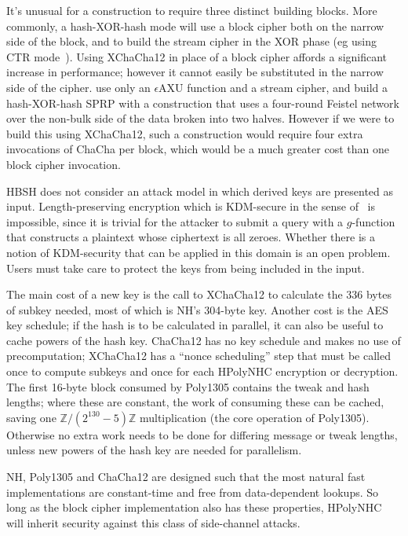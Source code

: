 \documentclass[journal=tosc,preprint,floatrow,submission]{iacrtrans}
\begin{document}
It's unusual for a construction to require three distinct building blocks.
More commonly, a hash-XOR-hash mode will use a block cipher both on the narrow side of the
block, and to build the stream cipher in the XOR phase (eg using CTR mode~\cite{ctr}).
Using XChaCha12 in place of a block cipher affords a significant increase in performance;
however it cannot easily be substituted in the narrow side of the cipher.
\cite{sarkar1,sarkar2,sarkar3,sarkar4} use only an $\epsilon$AXU function
and a stream cipher, and build a hash-XOR-hash SPRP
with a construction that uses a four-round Feistel network over the non-bulk side of the data
broken into two halves. However if we were to build this using XChaCha12,
such a construction would require four extra invocations of ChaCha per block, which would be
a much greater cost than one block cipher invocation.

HBSH does not consider an attack model in which derived keys are presented as input.
Length-preserving encryption
which is KDM-secure in the sense of~\cite{kdm} is impossible, since it is trivial for the
attacker to submit a query with a $g$-function
that constructs a plaintext whose ciphertext is all zeroes.
Whether there is a notion of KDM-security that can be
applied in this domain is an open problem. Users must take care to protect the keys from being
included in the input.

The main cost of a new key is the call to XChaCha12 to calculate the 336 bytes of subkey needed,
most of which is NH's 304-byte key. Another cost is the AES key schedule;
if the hash is to be calculated in parallel, it can also
be useful to cache powers of the hash key.
ChaCha12 has no key schedule and makes no use of
precomputation; XChaCha12 has a ``nonce scheduling'' step that
must be called once to compute subkeys and once for each HPolyNHC encryption or decryption.
The first 16-byte block consumed by Poly1305 contains the tweak and hash lengths; where
these are constant, the work of consuming these can be cached,
saving one $\mathbb{Z}/(2^{130}-5)\mathbb{Z}$ multiplication (the core operation of Poly1305).
Otherwise no extra work needs to be done for differing message or tweak lengths, unless
new powers of the hash key are needed for parallelism.

NH, Poly1305 and ChaCha12 are designed such that the most natural fast implementations are
constant-time and free from data-dependent lookups. So long as the block cipher implementation
also has these properties, HPolyNHC will inherit security against
this class of side-channel attacks.
\end{document}

